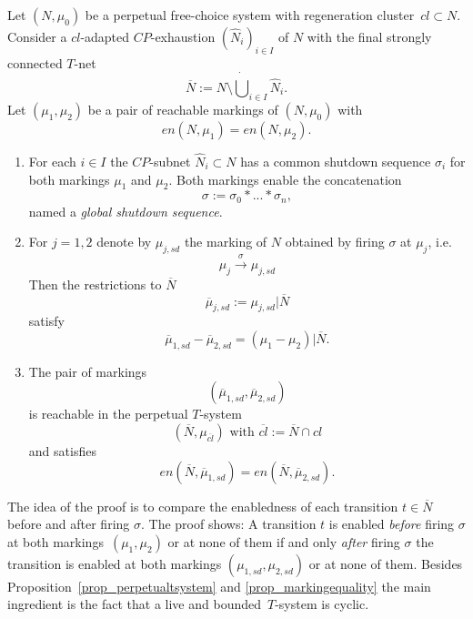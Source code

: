 \documentclass{fundam}
\begin{document}
\begin{proposition}\label{prop_propagatingenablingequivalence}
Let $(N,\mu_0)$ be a perpetual free-choice system with regeneration \mbox{cluster $cl \subset N$}. Consider a $cl$-adapted $CP$-exhaustion $(\hat{N}_i)_{i \in I}$ of $N$ with the final strongly connected $T$-net
$$\overline{N}:=N \setminus{} \dot\bigcup_{i \in I} \hat{N}_i.$$
Let $(\mu_1,\mu_2)$ be a pair of reachable markings of $(N,\mu_0)$ with
$$en(N,\mu_1)=en(N,\mu_2).$$
\begin{enumerate}
\item For each $i\in I$ the $CP$-subnet $\hat{N}_i \subset N$ has a common shutdown sequence $\sigma_i$ for both markings $\mu_1$ and $\mu_2$. Both markings enable the concatenation
$$\sigma:=\sigma_0*...*\sigma_n,$$
named a \emph{global shutdown sequence}.

\item For $j=1,2$ denote by $\mu_{j,sd}$ the marking of $N$ obtained by firing $\sigma$ at $\mu_j$, i.e.
$$\mu_j \xrightarrow{\sigma} \mu_{j,sd}$$
Then the restrictions to $\overline{N}$
$$\overline{\mu}_{j,sd}:=\mu_{j,sd}|\overline{N}$$
satisfy
$$\overline{\mu}_{1,sd}-\overline{\mu}_{2,sd}=(\mu_1-\mu_2)|\overline{N}.$$
\item The pair of markings
$$(\overline{\mu}_{1,sd},\overline{\mu}_{2,sd})$$
is reachable in the perpetual $T$-system
$$(\overline{N},\mu_{\overline{cl}}) \text{ with } \overline{cl}:=\overline{N} \cap cl$$
and satisfies
$$en(\overline{N},\overline{\mu}_{1,sd})=en(\overline{N},\overline{\mu}_{2,sd}).$$
\end{enumerate}
\end{proposition}

\noindent The idea of the proof is to compare the enabledness of each transition $t \in \overline{N}$ before and after firing $\sigma$. The proof shows: A transition $t$ is enabled \textit{before} firing $\sigma$ at both \mbox{markings $(\mu_1,\mu_2)$} or at none of them if and only \textit{after} firing $\sigma$ the transition is enabled at both markings $(\mu_{1,sd},\mu_{2,sd})$ or at none of them. Besides \mbox{Proposition \ref{prop_perpetualtsystem}} and \ref{prop_markingequality} the main ingredient is the fact that a live and \mbox{bounded $T$-system} is cyclic.
\end{document}
